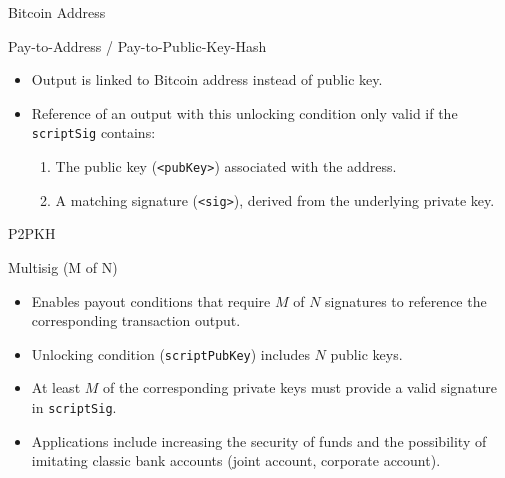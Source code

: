 \documentclass[]{beamer}
\begin{document}
\begin{frame}{Bitcoin Address}
\begin{figure}[h!]
\center

\end{figure}
\end{frame}


\begin{frame}{Pay-to-Address / Pay-to-Public-Key-Hash}
\vspace{1em}
\begin{itemize}
	\item<2-> Output is linked to Bitcoin address instead of public key.
	\item<3-> Reference of an output with this unlocking condition only valid if the \texttt{scriptSig} contains:
	
	\begin{enumerate}
	 \item<4-> The public key (\texttt{<pubKey>}) associated with the address.
	 \item<4-> A matching signature (\texttt{<sig>}), derived from the underlying private key.
	\end{enumerate}
\end{itemize}
\end{frame}


\begin{frame}{P2PKH}
	
\begin{figure}
\centering
 
\end{figure}

\end{frame}

\begin{frame}{Multisig (M of N)}
\vspace{1em}
\begin{itemize}
  \item Enables payout conditions that require $M$ of $N$ signatures to reference the corresponding transaction output.
  \item<2-> Unlocking condition (\texttt{scriptPubKey}) includes $N$ public keys.
  \item<3-> At least $M$ of the corresponding private keys must provide a valid signature in \texttt{scriptSig}.
  \item<4-> Applications include increasing the security of funds and the possibility of imitating classic bank accounts (joint account, corporate account).
\end{itemize}
\end{frame}
\end{document}
